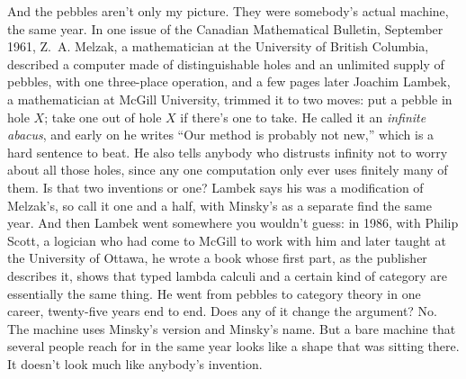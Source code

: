 \documentclass[11pt,twoside]{article}
\theoremstyle{thielethm}
\theoremstyle{thieledef}
\theoremstyle{thieledef}
\theoremstyle{thieledef}
\theoremstyle{thielethm}
\theoremstyle{thieleobs}
\theoremstyle{thielethm}
\begin{document}
And the pebbles aren't only my picture. They were somebody's actual machine, the same year.
In one issue of the Canadian Mathematical Bulletin, September 1961, Z.~A. Melzak, a
mathematician at the University of British Columbia, described a
computer made of distinguishable holes and an unlimited supply of pebbles, with one
three-place operation, and a few pages later Joachim Lambek, a mathematician at McGill
University, trimmed it to two moves: put a
pebble in hole $X$; take one out of hole $X$ if there's one to take. He called it an
\emph{infinite abacus}, and early on he writes ``Our method is probably not new,'' which is
a hard sentence to beat. He also tells anybody who distrusts infinity not to worry
about all those holes, since any one computation only ever uses finitely many of them.
Is that two inventions or one? Lambek says his was a modification of Melzak's, so call it one
and a half, with Minsky's as a separate find the same year. And then Lambek went somewhere
you wouldn't guess: in 1986, with Philip Scott, a logician who had come to McGill to work with
him and later taught at the University of Ottawa, he wrote a book whose first part, as the
publisher describes it, shows that typed lambda
calculi and a certain kind of category are essentially the same thing. He went from pebbles to category
theory in one career, twenty-five years end to end. Does any of it change the argument? No. The
machine uses Minsky's version and Minsky's name. But a bare machine that several people
reach for in the same year looks like a shape that was sitting there. It doesn't look much like
anybody's invention.
\end{document}
